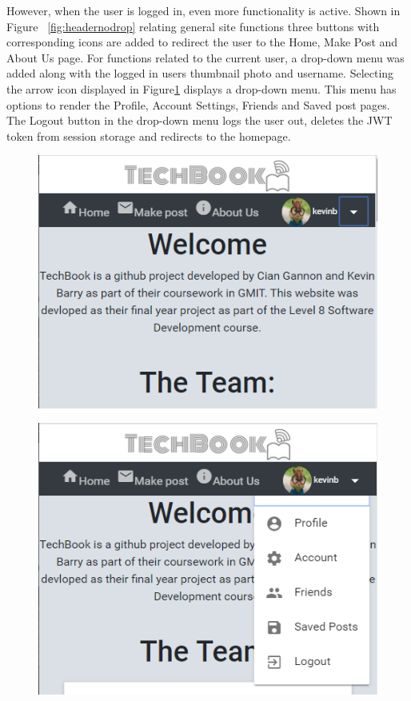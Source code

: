 However, when the user is logged in, even more functionality is active. Shown in Figure  ~\ref{fig:headernodrop} relating general site functions three buttons with corresponding icons are added to redirect the user to the Home, Make Post and About Us page. For functions related to the current user, a drop-down menu was added along with the logged in users thumbnail photo and username. Selecting the arrow icon displayed in Figure\ref{fig:headerdrop} displays a drop-down menu. This menu has options to render the Profile, Account Settings, Friends and Saved post pages. The Logout button in the drop-down menu logs the user out, deletes the JWT token from session storage and redirects to the homepage. 
\begin{figure}[H]
\centering
\begin{minipage}{.5\textwidth}
  \centering
  \includegraphics[width=.9\linewidth]{img/ui/headernodrop.PNG}
  \label{fig:headernodrop}
\end{minipage}%
\begin{minipage}{.5\textwidth}
  \centering
  \includegraphics[width=.9\linewidth]{img/ui/headerdrop.PNG}
  \label{fig:headerdrop}
\end{minipage}
\end{figure}



